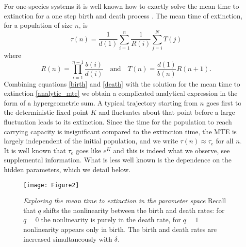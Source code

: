For one-species systems it is well known how to exactly solve the mean time to extinction for a one step birth and death process \cite{Nisbet1982,Palamara2013}.
The mean time of extinction, for a population of size $n$, is
\begin{equation}
\tau(n) = \frac{1}{d(1)} \sum_{i=1}^n \frac{1}{R(i)} \sum_{j=i}^N T(j)
\label{analytic_mte}
\end{equation}
where
\begin{equation*}
R(n) = \prod_{i=1}^{n-1} \frac{b(i)}{d(i)} \quad \textrm{and} \quad T(n) = \frac{d(1)}{b(n)}R(n+1).
\end{equation*}
Combining equations \ref{birth} and \ref{death} with the solution for the mean time to extinction \ref{analytic_mte} we obtain a complicated analytical expression in the form of a hypergeometric sum.
A typical trajectory starting from $n$ goes first to the deterministic fixed point $K$ and fluctuates about that point before a large fluctuation leads to its extinction.
Since the time for the population to reach carrying capacity is insignificant compared to the extinction time, the MTE is largely independent of the initial population, and we write $\tau (n) \approx \tau_e$ for all $n$.
It is well known that $\tau_e$ goes like $e^K$ \cite{Ovaskainen2010} and this is indeed what we observe, see supplemental information.
What is less well known is the dependence on the hidden parameters, which we detail below.
\iffalse
\begin{figure}[ht!]
\centering
\texttt{[image: MTE\_vsK (4 lines at lowlow, highhigh, highlow, lowhigh]}
\begin{figure}[ht!]
\centering
\texttt{[image: MTE\_QvsD\_K100\_100]}
\caption{\emph{Lorum ipsum} So many words..} \label{otherlabel}
\end{figure}
\end{figure}
\fi
\begin{figure}[ht!]
\centering
\texttt{[image: Figure2]}
\caption{\emph{Exploring the mean time to extinction in the parameter space} Recall that $q$ shifts the nonlinearity between the birth and death rates: for $q=0$ the nonlinearity is purely in the death rate, for $q=1$ nonlinearity appears only in birth. The birth and death rates are increased simultaneously with $\delta$.} \label{mteCP}
\end{figure}


